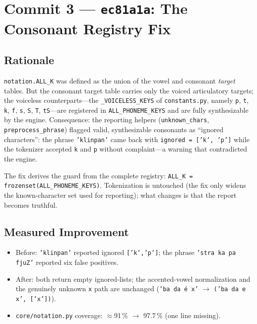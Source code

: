 \documentclass[11pt,a4paper]{article}
\newcommand{\code}[1]{\texttt{#1}}
\newcommand{\commit}[1]{\texttt{#1}}
\newcommand{\pct}[1]{{#1}\,\%}
\begin{document}
\section{Commit 3 --- \commit{ec81a1a}: The Consonant Registry Fix}
\label{sec:c3}

\subsection{Rationale}

\code{notation.ALL\_K} was defined as the union of the vowel and
consonant \emph{target} tables. But the consonant target table
carries only the voiced articulatory targets; the voiceless
counterparts---the \code{\_VOICELESS\_KEYS} of
\code{constants.py}, namely \code{p}, \code{t}, \code{k},
\code{f}, \code{s}, \code{S}, \code{T}, \code{tS}---are
registered in \code{ALL\_PHONEME\_KEYS} and are fully
synthesizable by the engine. Consequence: the reporting helpers
(\code{unknown\_chars}, \code{preprocess\_phrase}) flagged valid,
synthesizable consonants as ``ignored characters'': the phrase
\code{'klinpan'} came back with \code{ignored = ['k', 'p']}
while the tokenizer accepted \code{k} and \code{p} without
complaint---a warning that contradicted the engine.

The fix derives the guard from the complete registry:
\code{ALL\_K = frozenset(ALL\_PHONEME\_KEYS)}. Tokenization is
untouched (the fix only widens the known-character set used for
reporting); what changes is that the report becomes truthful.

\subsection{Measured Improvement}

\begin{itemize}[leftmargin=1.4em, itemsep=0.15em]
  \item Before: \code{'klinpan'} reported ignored
        \code{['k','p']}; the phrase \code{'stra ka pa fjuZ'}
        reported six false positives.
  \item After: both return empty ignored-lists; the accented-vowel
        normalization and the genuinely unknown \code{x} path are
        unchanged (\code{'ba da \'e x'} $\to$ \code{('ba da e x',
        ['x'])}).
  \item \code{core/notation.py} coverage: $\approx$91\,\%
        $\to$ \pct{97.7} (one line missing).
\end{itemize}
\end{document}
